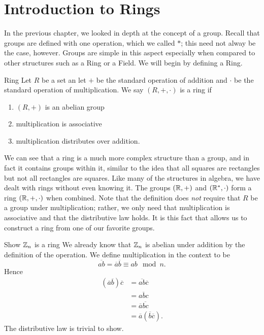 \section{Introduction to Rings}

In the previous chapter, we looked in depth at the concept of a group.
Recall that groups are defined with one operation, which we called $*$; this need not alway be the case, however.
Groups are simple in this aspect especially when compared to other structures such as a Ring or a Field.
We will begin by defining a Ring.

\begin{definition}{Ring}
    Let $R$ be a set an let $+$ be the standard operation of addition and $\cdot$ be the standard operation of multiplication. We say $(R,+,\cdot)$ is a ring if
    \begin{enumerate}
        \item $(R,+)$ is an abelian group
        \item multiplication is associative
        \item multiplication distributes over addition.
    \end{enumerate}
\end{definition}

We can see that a ring is a much more complex structure than a group, and in fact it contains groups within it, similar to the idea that all squares are rectangles but not all rectangles are squares.
Like many of the structures in algebra, we have dealt with rings without even knowing it.
The groups $(\mathbb{R}, +)$ and $(\mathbb{R}^{*},\cdot)$ form a ring $(\mathbb{R}, +, \cdot)$ when combined.
Note that the definition does \textit{not} require that $R$ be a group under multiplication; rather, we only need that multiplication is associative and that the distributive law holds.
It is this fact that allows us to construct a ring from one of our favorite groups.

\begin{example}{Show $\mathbb{Z}_{n}$ is a ring}
    We already know that $\mathbb{Z}_{n}$ is abelian under addition by the definition of the operation. We define multiplication in the context to be
    \[
        \overline{ab}=\overline{a}\overline{b}\equiv ab\mod n.
    \]
    Hence
    \begin{align*}
        (\overline{a}\overline{b})\overline{c} &= \overline{ab}\overline{c}\\
        &= \overline{abc}\\
        &= \overline{a}\overline{bc}\\
        &= \overline{a}(\overline{b}\overline{c}).
    \end{align*}
    The distributive law is trivial to show.
\end{example}

